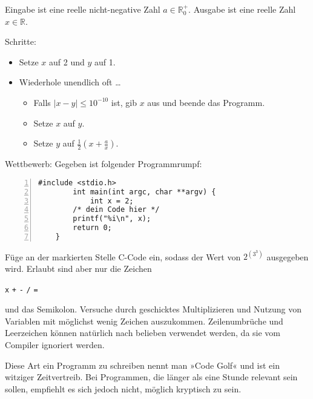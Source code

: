 \documentclass{uebungszettel}
\begin{document}
\begin{aufg}
    \begin{algorithm}[H]
        \caption{}
        Eingabe ist eine reelle nicht-negative Zahl $a \in \mathbb R_0^+$.
        Ausgabe ist eine reelle Zahl $x \in \mathbb R$.

        Schritte:
        \begin{itemize}
            \item
                Setze $x$ auf 2 und $y$ auf 1.
            \item
                Wiederhole unendlich oft …
                \begin{itemize}
                    \item 
                        Falls $|x - y| \leq 10^{-10}$ ist, gib $x$ aus und
                        beende das Programm.
                    \item
                        Setze $x$ auf $y$.
                    \item
                        Setze $y$ auf $\frac12 (x + \frac ax)$.
                \end{itemize}
        \end{itemize}
    \end{algorithm}
\end{aufg}

\begin{aufg}
    Wettbewerb: Gegeben ist folgender Programmrumpf:
    \begin{codelisting}
        \begin{lstlisting}[numbers=left,numberstyle=\tiny,frame=tlrb]
        #include <stdio.h>
        int main(int argc, char **argv) {
            int x = 2;
        /* dein Code hier */
        printf("%i\n", x);
        return 0;
    }
        \end{lstlisting}
    \end{codelisting}
    Füge an der markierten Stelle C-Code ein, sodass der Wert von $2^{\left(3^3\right)}$ ausgegeben wird. Erlaubt sind aber nur die Zeichen 
    \begin{center}
        \texttt x \quad \texttt + \quad \texttt - \quad \texttt * \quad \texttt / \quad \texttt =
    \end{center}
    und das Semikolon. Versuche durch geschicktes Multiplizieren und Nutzung
    von Variablen mit möglichst wenig Zeichen auszukommen. Zeilenumbrüche und
    Leerzeichen können natürlich nach belieben verwendet werden, da sie vom
    Compiler ignoriert werden.

    Diese Art ein Programm zu schreiben nennt man »Code Golf« und ist ein
    witziger Zeitvertreib. Bei Programmen, die länger als eine Stunde relevant
    sein sollen, empfiehlt es sich jedoch nicht, möglich kryptisch zu sein.
\end{aufg}
\end{document}
